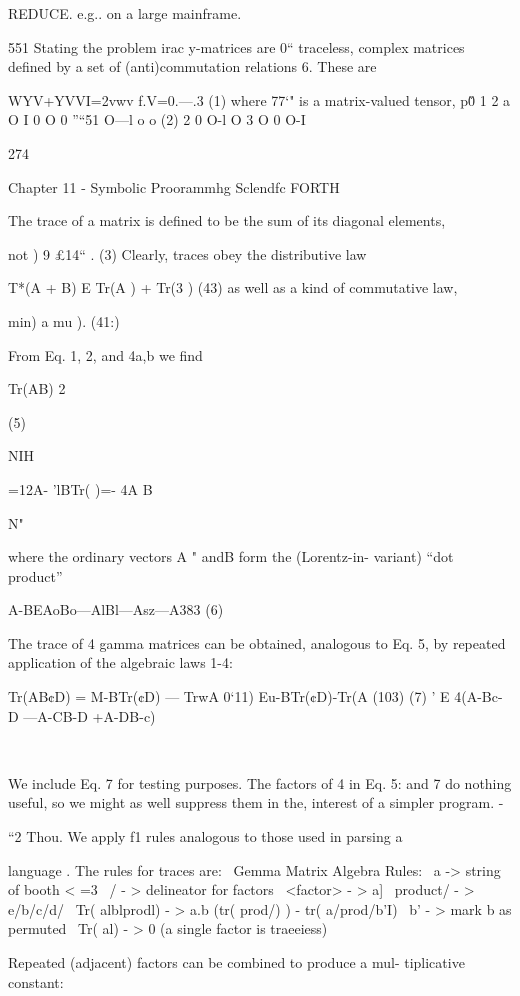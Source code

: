 REDUCE. e.g.. on a large mainframe.

551 Stating the problem
irac y-matrices are 0“ traceless, complex matrices deﬁned
by a set of (anti)commutation relations 6. These are

WYV+YVVI=2vwv f.V=0.---.3 (1)
where 77‘" is a matrix-valued tensor,
p\v0 1 2 a
O I 0 O 0
”“51 O—l o o (2)
2 0 O-l O
3 O 0 O-I

274

Chapter 11 - Symbolic Proorammhg Sclendfc FORTH

The trace of a matrix is deﬁned to be the sum of its diagonal
elements,

not ) 9 £14“ . (3)
Clearly, traces obey the distributive law

T*(A + B) E Tr(A ) + Tr(3 ) (43)
as well as a kind of commutative law,

min) a mu ). (41:)

From Eq. 1, 2, and 4a,b we ﬁnd

Tr(AB) 2%

(5)

NIH

 

=12A- 'lBTr( )=- 4A B

N"

where the ordinary vectors A " andB form the (Lorentz-in-
variant) “dot product”

A-BEAoBo—AlBl—Asz—A383 (6)

The trace of 4 gamma matrices can be obtained, analogous to
Eq. 5, by repeated application of the algebraic laws 1-4:

Tr(AB¢D) = M-BTr(¢D) — TrwA 0‘11)
Eu-BTr(¢D)-Tr(A (103) (7) '
E 4(A-Bc-D —A-CB-D +A-DB-c)

\

We include Eq. 7 for testing purposes. The factors of 4 in Eq. 5:
and 7 do nothing useful, so we might as well suppress them in the,
interest of a simpler program. -


“2 Thou.
We apply f1 rules analogous to those used in parsing a

language . The rules for traces are:
\ Gemma Matrix Algebra Rules:
\ a -> string of booth < =3
\ / - > delineator for factors
\ <factor> - > a]
\ product/ - > e/b/c/d/
\ Tr( alblprodl) - > a.b (tr( prod/) ) - tr( a/prod/b'I)
\ b' - > mark b as permuted
\ Tr( al) - > 0 (a single factor is traeeiess)

Repeated (adjacent) factors can be combined to produce a mul-
tiplicative constant:

